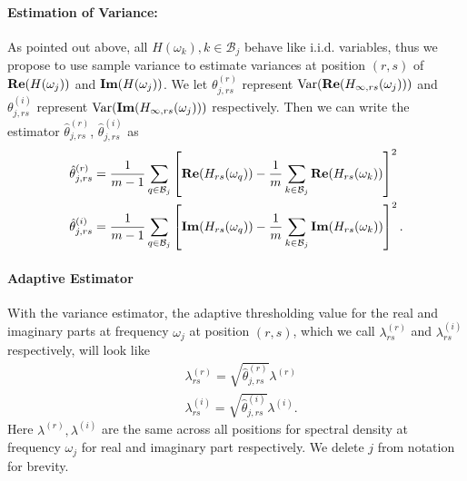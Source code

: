 \paragraph{Estimation of Variance:}
As pointed out above, all $H(\omega_k), k\in \mathcal{B}_j$ behave like i.i.d. variables, thus we propose to use sample variance to estimate variances at position $(r, s)$ of ${\bf Re}(H(\omega_j))$ and 
${\bf Im}(H(\omega_j))$. We let $\theta^{(r)}_{j, rs}$ represent  $\mathrm{Var}({\bf Re}(H_{\infty, rs}(\omega_j)))$ and $\theta^{(i)}_{j, rs}$ represent $\mathrm{Var}({\bf Im}(H_{\infty, rs}(\omega_j)))$ respectively.  Then we can write the estimator $\hat{\theta}^{(r)}_{j,rs}$,  $\hat{\theta}^{(i)}_{j,rs} $ as 
\begin{equation}
\label{eq:variance_estimator}
\begin{aligned}
& \hat{\theta}^{(r)}_{j,rs} = \frac{1}{m-1}\sum_{q\in \mathcal{B}_j} \left[{\bf Re}(H_{rs}(\omega_q)) - \frac{1}{m}\sum_{k\in \mathcal{B}_j} {\bf Re}(H_{rs}(\omega_k))\right]^2 \\
&\hat{\theta}^{(i)}_{j,rs} = \frac{1}{m-1}\sum_{q\in \mathcal{B}_j} \left[{\bf Im}(H_{rs}(\omega_q)) - \frac{1}{m}\sum_{k\in \mathcal{B}_j} {\bf Im}(H_{rs}(\omega_k))\right]^2. 
\end{aligned}
\end{equation}

\paragraph{Adaptive Estimator}
With the variance estimator,  the adaptive thresholding value for the real and imaginary parts at frequency $\omega_j$ at position $(r, s)$, which we call $\lambda^{(r)}_{rs}$ and $\lambda^{(i)}_{rs}$ respectively, will look like
\begin{equation}
\begin{aligned}
& \lambda^{(r)}_{rs} = \sqrt{\hat{\theta}^{(r)}_{j, rs}} \lambda^{(r)} \\
& \lambda^{(i)}_{rs}= \sqrt{\hat{\theta}^{(i)}_{j, rs}} \lambda^{(i)}.
\end{aligned}
\end{equation}
Here $\lambda^{(r)}, \lambda^{(i)}$ are the same across all positions for spectral density at frequency $\omega_j$ for real and imaginary part respectively. We delete $j$ from notation for brevity.  


